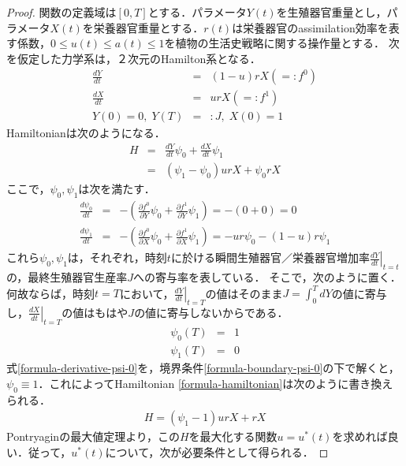 \documentclass[uplatex, dvipdfmx]{jsarticle}
\begin{document}
\begin{proof}
関数の定義域は$[0,T]$とする．パラメータ$Y(t)$を生殖器官重量とし，パラメータ$X(t)$を栄養器官重量とする．$r(t)$は栄養器官のassimilation効率を表す係数，$0\le u(t)\le a(t)\le 1$を植物の生活史戦略に関する操作量とする．
    次を仮定した力学系は，２次元のHamilton系となる．
    \begin{eqnarray*}
        \frac{dY}{dt} &=& (1-u)rX (=:f^0)  \\
        \frac{dX}{dt} &=& urX (=:f^1) \\
        Y(0)=0,\; Y(T)&=&:J,\;X(0)=1
    \end{eqnarray*}
    Hamiltonianは次のようになる．
    \begin{eqnarray}
        H &=& \frac{dY}{dt}\psi_0 + \frac{dX}{dt}\psi_1 \\
        &=& (\psi_1-\psi_0)urX + \psi_0rX \label{formula-hamiltonian}
    \end{eqnarray}
    ここで，$\psi_0,\psi_1$は次を満たす．
    \begin{eqnarray}
        \frac{d\psi_0}{dt} &=& - \left( \frac{\partial f^0}{\partial Y}\psi_0 + \frac{\partial f^1}{\partial Y}\psi_1 \right) = - (0+0) = 0 \label{formula-derivative-psi-0} \\
        \frac{d\psi_1}{dt} &=& - \left( \frac{\partial f^0}{\partial X}\psi_0 + \frac{\partial f^1}{\partial X}\psi_1 \right) = - ur\psi_0 - (1-u)r\psi_1
    \end{eqnarray}
    これら$\psi_0,\psi_1$は，それぞれ，時刻$t$に於ける瞬間生殖器官／栄養器官増加率$\left.\frac{dY}{dt}\right|_{t=t}$の，最終生殖器官生産率$J$への寄与率を表している\cite{Shoot/root balance of plants: Optimal growth of a system with many vegetative organs}．
    そこで，次のように置く．何故ならば，時刻$t=T$において，$\left.\frac{dY}{dt}\right|_{t=T}$の値はそのまま$J=\int^T_0dY$の値に寄与し，$\left.\frac{dX}{dt}\right|_{t=T}$の値はもはや$J$の値に寄与しないからである．
    \begin{eqnarray}
        \psi_0(T)&=&1 \label{formula-boundary-psi-0} \\
        \psi_1(T)&=&0
    \end{eqnarray}
    式\ref{formula-derivative-psi-0}を，境界条件\ref{formula-boundary-psi-0}の下で解くと，$\psi_0\equiv 1$．これによってHamiltonian \ref{formula-hamiltonian}は次のように書き換えられる．
    \begin{eqnarray}
        H = (\psi_1-1)urX+rX
    \end{eqnarray}
    Pontryaginの最大値定理より，この$H$を最大化する関数$u=u^*(t)$を求めれば良い．従って，$u^*(t)$について，次が必要条件として得られる．

\end{proof}
\end{document}
